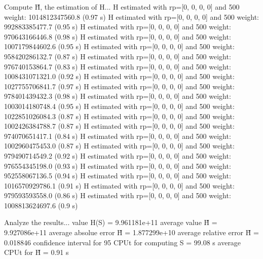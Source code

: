 Compute H̃, the estimation of H...
  H estimated with rp=[0, 0, 0, 0] and 500 weight:  1014812347560.8  (0.97 s)
  H estimated with rp=[0, 0, 0, 0] and 500 weight:  992883385477.7  (0.95 s)
  H estimated with rp=[0, 0, 0, 0] and 500 weight:  970643166446.8  (0.98 s)
  H estimated with rp=[0, 0, 0, 0] and 500 weight:  1007179844602.6  (0.95 s)
  H estimated with rp=[0, 0, 0, 0] and 500 weight:  958420286132.7  (0.87 s)
  H estimated with rp=[0, 0, 0, 0] and 500 weight:  976740153864.7  (0.83 s)
  H estimated with rp=[0, 0, 0, 0] and 500 weight:  1008431071321.0  (0.92 s)
  H estimated with rp=[0, 0, 0, 0] and 500 weight:  1027755706841.7  (0.97 s)
  H estimated with rp=[0, 0, 0, 0] and 500 weight:  978401439432.3  (0.98 s)
  H estimated with rp=[0, 0, 0, 0] and 500 weight:  1003014180748.4  (0.95 s)
  H estimated with rp=[0, 0, 0, 0] and 500 weight:  1022851026084.3  (0.87 s)
  H estimated with rp=[0, 0, 0, 0] and 500 weight:  1002426384788.7  (0.87 s)
  H estimated with rp=[0, 0, 0, 0] and 500 weight:  974070651417.1  (0.84 s)
  H estimated with rp=[0, 0, 0, 0] and 500 weight:  1002960475453.0  (0.87 s)
  H estimated with rp=[0, 0, 0, 0] and 500 weight:  979490714549.2  (0.92 s)
  H estimated with rp=[0, 0, 0, 0] and 500 weight:  976554345198.0  (0.93 s)
  H estimated with rp=[0, 0, 0, 0] and 500 weight:  952558067136.5  (0.94 s)
  H estimated with rp=[0, 0, 0, 0] and 500 weight:  1016570929786.1  (0.91 s)
  H estimated with rp=[0, 0, 0, 0] and 500 weight:  979593593558.0  (0.86 s)
  H estimated with rp=[0, 0, 0, 0] and 500 weight:  1008813624697.6  (0.9 s)

Analyze the results...
  value H(S)                  = 9.961181e+11 
  average value H̃             = 9.927086e+11 
  average absolue error H̃     = 1.877299e+10 
  average relative error H̃    = 0.018846 
  confidence interval for 95%
  CPUt for computing S         = 99.08 s
  average CPUt for H̃           = 0.91 s

